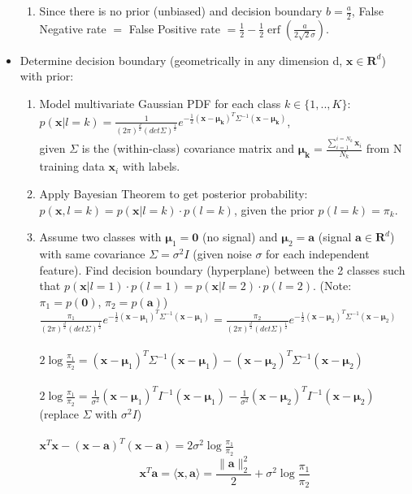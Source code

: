 \documentclass[11pt]{article}
\DeclareMathOperator{\erf}{erf}
\begin{document}
\begin{itemize}
\begin{enumerate}
    
    \item Since there is no prior (unbiased) and decision boundary $b=\frac{a}{2}$, False Negative rate $=$ False Positive rate $= \frac{1}{2} - \frac{1}{2} \erf(\frac{a}{2\sqrt{2}\sigma})$.
\end{enumerate}

\item Determine decision boundary (geometrically in any dimension d, $\mathbf{x} \in \mathbf{R}^d$) with prior:
\begin{enumerate}
    \item Model multivariate Gaussian PDF for each class $k \in \{1,..,K\}$:\\
    $p(\mathbf{x}|l=k) = \frac{1}{{(2\pi)}^{\frac{d}{2}} {(det\Sigma)}^{\frac{1}{2}}} e^{-\frac{1}{2}{(\mathbf{x}-\mathbf{\mu_k})}^T \Sigma^{-1}{(\mathbf{x}-\mathbf{\mu_k})}}$,\\
    given $\Sigma$ is the (within-class) covariance matrix and $\mathbf{\mu_k} = \frac{\sum_{i=1}^{i=N_k} \mathbf{x}_i}{N_k}$ from N training data $\mathbf{x}_i$ with labels. 
    \item Apply Bayesian Theorem to get posterior probability: $p(\mathbf{x}, l=k) = p(\mathbf{x}|l=k) \cdot p(l=k)$, given the prior $p(l=k) = \pi_k$.
    \item Assume two classes with $\mathbf{\mu}_1 = \mathbf{0}$ (no signal) and $\mathbf{\mu}_2 = \mathbf{a}$ (signal $\mathbf{a} \in \mathbf{R}^d$) with same covariance $\Sigma = \sigma^2 I$ (given noise $\sigma$ for each independent feature). Find decision boundary (hyperplane) between the 2 classes such that $p(\mathbf{x}|l=1)\cdot p(l=1) = p(\mathbf{x}|l=2)\cdot p(l=2)$. (Note: $\pi_1 = p(\mathbf{0})$, $\pi_2 = p(\mathbf{a})$)\\
   
    $\frac{\pi_1}{{(2\pi)}^{\frac{d}{2}} {(det\Sigma)}^{\frac{1}{2}}} e^{-\frac{1}{2}{(\mathbf{x}-\mathbf{\mu}_1)}^T \Sigma^{-1}{(\mathbf{x}-\mathbf{\mu}_1)}} = \frac{\pi_2}{{(2\pi)}^{\frac{d}{2}} {(det\Sigma)}^{\frac{1}{2}}} e^{-\frac{1}{2}{(\mathbf{x}-\mathbf{\mu}_2)}^T \Sigma^{-1}{(\mathbf{x}-\mathbf{\mu}_2)}}$ \\\\
    $2\log{\frac{\pi_1}{\pi_2}} = {(\mathbf{x}-\mathbf{\mu}_1)}^T \Sigma^{-1}{(\mathbf{x}-\mathbf{\mu}_1)} - {(\mathbf{x}-\mathbf{\mu}_2)}^T \Sigma^{-1}{(\mathbf{x}-\mathbf{\mu}_2)}$\\\\
    $2\log{\frac{\pi_1}{\pi_2}} = \frac{1}{\sigma^2}{(\mathbf{x}-\mathbf{\mu}_1)}^T I^{-1}{(\mathbf{x}-\mathbf{\mu}_1)} - \frac{1}{\sigma^2}{(\mathbf{x}-\mathbf{\mu}_2)}^T I^{-1}{(\mathbf{x}-\mathbf{\mu}_2)}$ (replace $\Sigma$ with $\sigma^2 I$)\\\\
    $\mathbf{x}^T\mathbf{x} - {(\mathbf{x}-\mathbf{a})}^T(\mathbf{x}-\mathbf{a}) = 2\sigma^2\log{\frac{\pi_1}{\pi_2}}$
    \begin{equation}
        \mathbf{x}^T\mathbf{a} = \langle \mathbf{x}, \mathbf{a} \rangle = \frac{\lVert \mathbf{a} \rVert_2^2}{2} + \sigma^2\log{\frac{\pi_1}{\pi_2}}
    \end{equation}
    

\end{enumerate}
\end{itemize}
\end{document}
